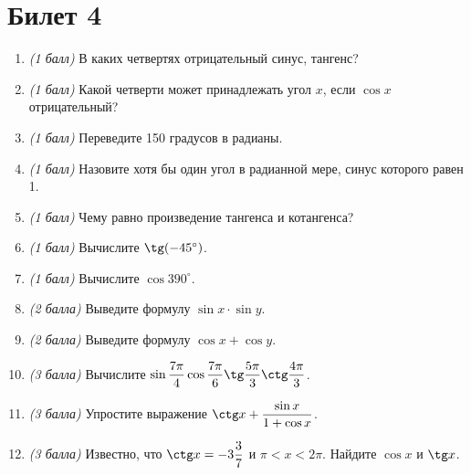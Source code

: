 \documentclass[12pt, a4paper]{article}
\begin{document}
	\section*{Билет 4}
	\begin{enumerate}
		\item \textit{(1 балл)} В каких четвертях отрицательный синус, тангенс?
		\item \textit{(1 балл)} Какой четверти может принадлежать угол $x$, если $\cos x$ отрицательный?
		\item \textit{(1 балл)} Переведите 150 градусов в радианы.
		\item \textit{(1 балл)}	Назовите хотя бы один угол в радианной мере, синус которого равен 1.
		\item \textit{(1 балл)} Чему равно произведение тангенса и котангенса?
		\item \textit{(1 балл)} Вычислите $\tg (-45^{\circ})$.
		\item \textit{(1 балл)} Вычислите $\cos 390^{\circ}$.
		\item \textit{(2 балла)} Выведите формулу $\sin x \cdot \sin y$.
		\item \textit{(2 балла)} Выведите формулу $\cos x + \cos y$.
		\item \textit{(3 балла)} Вычислите $\sin \dfrac{7\pi}{4} \cos \dfrac{7\pi}{6} \tg \dfrac{5\pi}{3} \ctg \dfrac{4\pi}{3}$.
		\item \textit{(3 балла)} Упростите выражение $\ctg x + \dfrac{\sin x}{1+\cos x}$.
		\item \textit{(3 балла)} Известно, что $\ctg x = -3\dfrac{3}{7}$ и $\pi<x<2\pi$. Найдите $\cos x$ и $\tg x$.
	\end{enumerate}
	
	\newpage 
	
\end{document}
